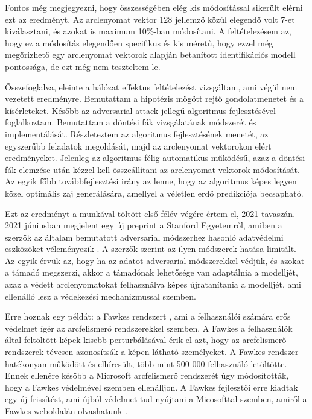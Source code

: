 Fontos még megjegyezni, hogy összességében elég kis módosítással sikerült elérni ezt az eredményt. Az arclenyomat vektor 128 jellemző közül elegendő volt 7-et kiválasztani, és azokat is maximum 10\%-ban módosítani. A feltételezésem az, hogy ez a módosítás elegendően specifikus és kis méretű, hogy ezzel még megőrizhető egy arclenyomat vektorok alapján betanított identifikációs modell pontossága, de ezt még nem teszteltem le.

Összefoglalva, eleinte a hálózat effektus feltételezést vizsgáltam, ami végül nem vezetett eredményre. Bemutattam a hipotézis mögött rejtő gondolatmenetet és a kísérleteket. Később az adversarial attack jellegű algoritmus fejlesztésével foglalkoztam. Bemutattam a döntési fák vizsgálatának módszerét és implementálását. Részleteztem az algoritmus fejlesztésének menetét, az egyszerűbb feladatok megoldását, majd az arclenyomat vektorokon elért eredményeket. Jelenleg az algoritmus félig automatikus működésű, azaz a döntési fák elemzése után kézzel kell összeállítani az arclenyomat vektorok módosítását. Az egyik főbb továbbfejlesztési irány az lenne, hogy az algoritmus képes legyen közel optimális zaj generálására, amellyel a véletlen erdő predikciója becsapható.

Ezt az eredményt a munkával töltött első félév végére értem el, 2021 tavaszán. 2021 júniusban megjelent egy új preprint a Stanford Egyetemről, amiben a szerzők az általam bemutatott adversarial módszerhez hasonló adatvédelmi eszközöket véleményezik \cite{radiya2021data}. A szerzők szerint az ilyen módszerek hatása limitált. Az egyik érvük az, hogy ha az adatot  adversarial módszerekkel védjük, és azokat a támadó megszerzi, akkor a támadónak lehetősége van adaptálnia a modelljét, azaz a védett arclenyomatokat felhasználva képes újratanítania a modelljét, ami ellenálló lesz a védekezési mechanizmussal szemben. 

Erre hoznak egy példát: a Fawkes rendszert \cite{shan2020fawkes}, ami a felhasználói számára erős védelmet ígér az arcfelismerő rendszerekkel szemben. A Fawkes a felhasználók által feltöltött képek kisebb perturbálásával érik el azt, hogy az arcfelismerő rendszerek tévesen azonosítsák a képen látható személyeket. A Fawkes rendszer hatékonyan működött és elhíresült, több mint 500 000 felhasználó letöltötte. Ennek ellenére később a Microsoft arcfelismerő rendszerét úgy módosították, hogy a Fawkes védelmével szemben ellenálljon. A Fawkes fejlesztői erre kiadtak egy új frissítést, ami újból védelmet tud nyújtani a Micosofttal szemben, amiről a Fawkes weboldalán olvashatunk \cite{fawkes_update}.

